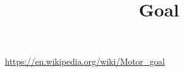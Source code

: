 \documentclass[a4paper]{article}
\title{Goal}
\date{}
\begin{document}
    \maketitle

    \url{https://en.wikipedia.org/wiki/Motor_goal}
\end{document}
